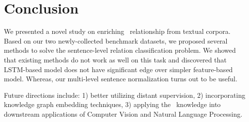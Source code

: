 \section{Conclusion}
We presented a novel study on enriching \lnear\ relationship from textual corpora. 
Based on our two newly-collected benchmark datasets, we proposed several methods to solve 
the sentence-level relation classification problem. 
We showed that existing methods do not work as well on this task and discovered that LSTM-based model does not have significant edge over simpler feature-based model. 
Whereas, our multi-level sentence normalization turns out to be useful.

Future directions include: 1) better utilizing distant supervision, 2) incorporating knowledge graph embedding techniques, 3) applying the \lnear\ knowledge into downstream applications of Computer Vision and Natural Language Processing.
